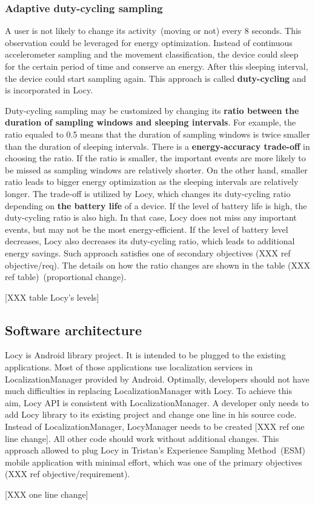 \subsubsection{Adaptive duty-cycling sampling}
\label{s:design:locy:adaptive}
A user is not likely to change its activity\ (moving or not) every 8 seconds. This observation could be leveraged for energy optimization. Instead of continuous accelerometer sampling and the movement classification, the device could sleep for the certain period of time and conserve an energy. After this sleeping interval, the device could start sampling again. This approach is called \textbf{duty-cycling} and is incorporated in Locy. 

Duty-cycling sampling may be customized by changing its \textbf{ratio between the duration of sampling windows and sleeping intervals}. For example, the ratio equaled to 0.5 means that the duration of sampling windows is twice smaller than the duration of sleeping intervals. There is a \textbf{energy-accuracy trade-off} in choosing the ratio. If the ratio is smaller, the important events are more likely to be missed as sampling windows are relatively shorter. On the other hand, smaller ratio leads to bigger energy optimization as the sleeping intervals are relatively longer. The trade-off is utilized by Locy, which changes its duty-cycling ratio depending on \textbf{the battery life} of a device. If the level of battery life is high, the duty-cycling ratio is also high. In that case, Locy does not miss any important events, but may not be the most energy-efficient. If the level of battery level decreases, Locy also decreases its duty-cycling ratio, which leads to additional energy savings. Such approach satisfies one of secondary objectives (XXX ref objective/req). The details on how the ratio changes are shown in the table (XXX ref table)\ (proportional change).

[XXX table Locy's levels]

\subsection{Software architecture}
\label{s:design:locy:architecture}
Locy is Android library project. It is intended to be plugged to the existing applications. Most of those applications use localization services in LocalizationManager provided by Android. Optimally, developers should not have much difficulties in replacing LocalizationManager with Locy. To achieve this aim, Locy API is consistent with LocalizationManager. A developer only needs to add Locy library to its existing project and change one line in his source code. Instead of LocalizationManager, LocyManager needs to be created [XXX ref one line change]. All other code should work without additional changes. This approach allowed to plug Locy in Tristan's Experience Sampling Method\ (ESM) mobile application with minimal effort, which was one of the primary objectives (XXX ref objective/requirement).

[XXX one line change]

